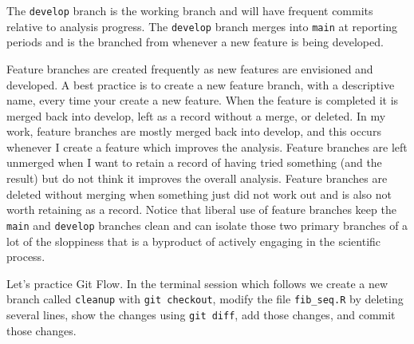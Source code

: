 \documentclass[
  letterpaper,
  DIV=11,
  numbers=noendperiod]{scrreprt}
\begin{document}
The \texttt{develop} branch is the working branch and will have frequent
commits relative to analysis progress. The \texttt{develop} branch
merges into \texttt{main} at reporting periods and is the branched from
whenever a new feature is being developed.

Feature branches are created frequently as new features are envisioned
and developed. A best practice is to create a new feature branch, with a
descriptive name, every time your create a new feature. When the feature
is completed it is merged back into develop, left as a record without a
merge, or deleted. In my work, feature branches are mostly merged back
into develop, and this occurs whenever I create a feature which improves
the analysis. Feature branches are left unmerged when I want to retain a
record of having tried something (and the result) but do not think it
improves the overall analysis. Feature branches are deleted without
merging when something just did not work out and is also not worth
retaining as a record. Notice that liberal use of feature branches keep
the \texttt{main} and \texttt{develop} branches clean and can isolate
those two primary branches of a lot of the sloppiness that is a
byproduct of actively engaging in the scientific process.

Let's practice Git Flow. In the terminal session which follows we create
a new branch called \texttt{cleanup} with \texttt{git\ checkout}, modify
the file \texttt{fib\_seq.R} by deleting several lines, show the changes
using \texttt{git\ diff}, add those changes, and commit those changes.
\end{document}
